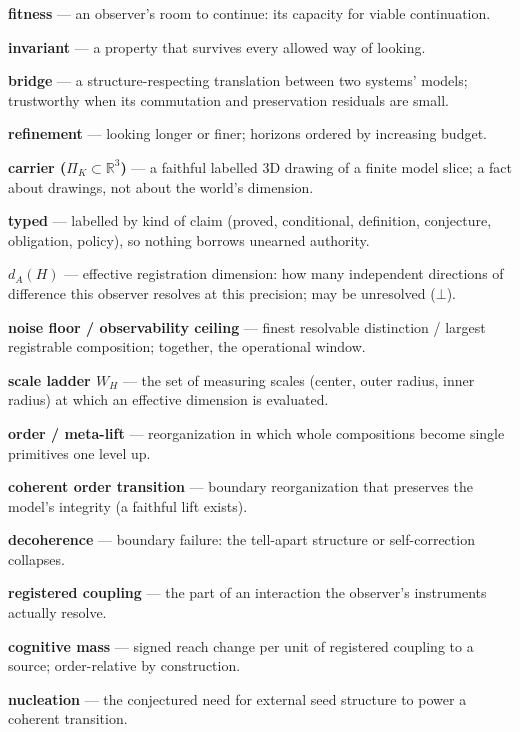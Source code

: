 \documentclass[11pt]{article}
\theoremstyle{definition}
\begin{document}
\noindent\textbf{fitness} --- an observer's room to continue: its capacity for viable continuation.

\noindent\textbf{invariant} --- a property that survives every allowed way of looking.

\noindent\textbf{bridge} --- a structure-respecting translation between two systems' models; trustworthy when its commutation and preservation residuals are small.

\noindent\textbf{refinement} --- looking longer or finer; horizons ordered by increasing budget.

\noindent\textbf{carrier ($\Pi_K \subset \mathbb{R}^3$)} --- a faithful labelled 3D drawing of a finite model slice; a fact about drawings, not about the world's dimension.

\noindent\textbf{typed} --- labelled by kind of claim (proved, conditional, definition, conjecture, obligation, policy), so nothing borrows unearned authority.

\noindent\textbf{$d_A(H)$} --- effective registration dimension: how many independent directions of difference this observer resolves at this precision; may be unresolved ($\bot$).

\noindent\textbf{noise floor / observability ceiling} --- finest resolvable distinction / largest registrable composition; together, the operational window.

\noindent\textbf{scale ladder $W_H$} --- the set of measuring scales (center, outer radius, inner radius) at which an effective dimension is evaluated.

\noindent\textbf{order / meta-lift} --- reorganization in which whole compositions become single primitives one level up.

\noindent\textbf{coherent order transition} --- boundary reorganization that preserves the model's integrity (a faithful lift exists).

\noindent\textbf{decoherence} --- boundary failure: the tell-apart structure or self-correction collapses.

\noindent\textbf{registered coupling} --- the part of an interaction the observer's instruments actually resolve.

\noindent\textbf{cognitive mass} --- signed reach change per unit of registered coupling to a source; order-relative by construction.

\noindent\textbf{nucleation} --- the conjectured need for external seed structure to power a coherent transition.
\end{document}
